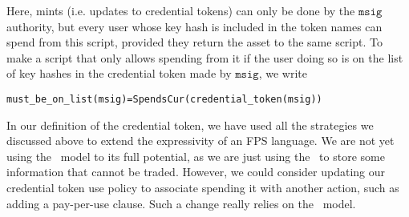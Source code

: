Here, mints (i.e. updates to credential tokens) can only be done by the
$\texttt{msig}$ authority,
but every user whose key hash is included in the token names can spend from
this script, provided they return the asset to the same script.
To make a script that only allows spending from it if the user doing so
is on the list of key hashes in the credential token made by $\texttt{msig}$, we write

\begin{alltt}
  must_be_on_list(msig) = SpendsCur(credential_token(msig))
\end{alltt}

In our definition of the credential token, we have used all the strategies
we discussed above to extend the expressivity of an FPS language.
We are not yet using the \UTXO\ model to its full potential, as we are just
using the \UTXO\ to store some information that cannot be traded. However, we
could consider updating
our credential token use policy to associate spending it with another action,
such as adding a pay-per-use clause. Such a change really relies on the
\UTXO\ model.
